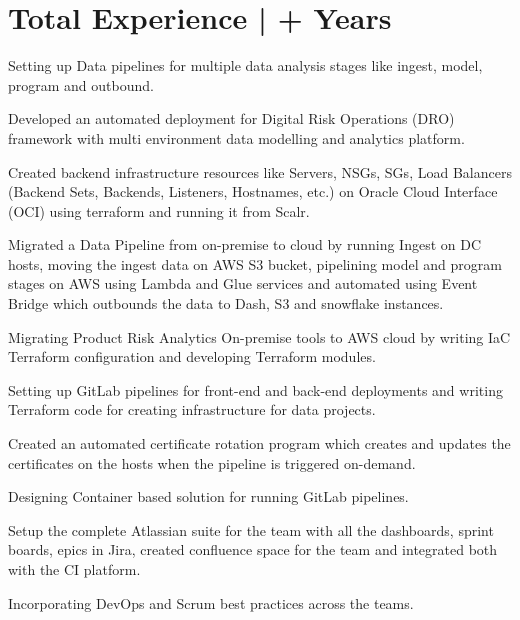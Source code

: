 \documentclass[a4paper]{deedy-resume-openfont}
\begin{document}
\section{Total Experience |  \bf\fontsize{10}{15}+ Years}
\begin{tightemize}
\item Setting up Data pipelines for multiple data analysis stages like ingest, model, program and outbound.
\item Developed an automated deployment for Digital Risk Operations (DRO) framework with multi environment data modelling and analytics platform.
\item Created backend infrastructure resources like Servers, NSGs, SGs, Load Balancers (Backend Sets, Backends, Listeners, Hostnames, etc.) on Oracle Cloud Interface (OCI) using terraform and running it from Scalr.
\item Migrated a Data Pipeline from on-premise to cloud by running Ingest on DC hosts, moving the ingest data on AWS S3 bucket, pipelining model and program stages on AWS using Lambda and Glue services and automated using Event Bridge which outbounds the data to Dash, S3 and snowflake instances.
\item Migrating Product Risk Analytics On-premise tools to AWS cloud by writing IaC Terraform configuration and developing Terraform modules.
\item Setting up GitLab pipelines for front-end and back-end deployments and writing Terraform code for creating infrastructure for data projects.
\item Created an automated certificate rotation program which creates and updates the certificates on the hosts when the pipeline is triggered on-demand.
\item Designing Container based solution for running GitLab pipelines.
\item Setup the complete Atlassian suite for the team with all the dashboards, sprint boards, epics in Jira, created confluence space for the team and integrated both with the CI platform.
\item Incorporating DevOps and Scrum best practices across the teams.
\end{tightemize}
\sectionsep
\end{document}
